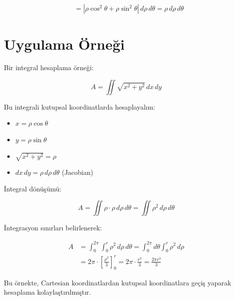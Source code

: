 \documentclass[11pt,letterpaper,twocolumn]{fenbil}
\begin{document}
\begin{align}
&= |\rho \cos^2 \theta + \rho \sin^2 \theta| \, d\rho \, d\theta = \rho \, d\rho \, d\theta
\end{align}

\section{Uygulama Örneği}

Bir integral hesaplama örneği:

\begin{equation}
A = \iint \sqrt{x^2 + y^2} \, dx \, dy
\end{equation}

Bu integrali kutupsal koordinatlarda hesaplayalım:
\begin{itemize}
\item $x = \rho \cos \theta$
\item $y = \rho \sin \theta$
\item $\sqrt{x^2 + y^2} = \rho$
\item $dx \, dy = \rho \, d\rho \, d\theta$ (Jacobian)
\end{itemize}

İntegral dönüşümü:

\begin{equation}
A = \iint \rho \cdot \rho \, d\rho \, d\theta = \iint \rho^2 \, d\rho \, d\theta
\end{equation}

İntegrasyon sınırları belirlenerek:

\begin{align}
A &= \int_0^{2\pi} \int_0^r \rho^2 \, d\rho \, d\theta = \int_0^{2\pi} d\theta \int_0^r \rho^2 \, d\rho\\
&= 2\pi \cdot \left[\frac{\rho^3}{3}\right]_0^r = 2\pi \cdot \frac{r^3}{3} = \frac{2\pi r^3}{3}
\end{align}

Bu örnekte, Cartesian koordinatlardan kutupsal koordinatlara geçiş yaparak hesaplama kolaylaştırılmıştır.
\end{document}
